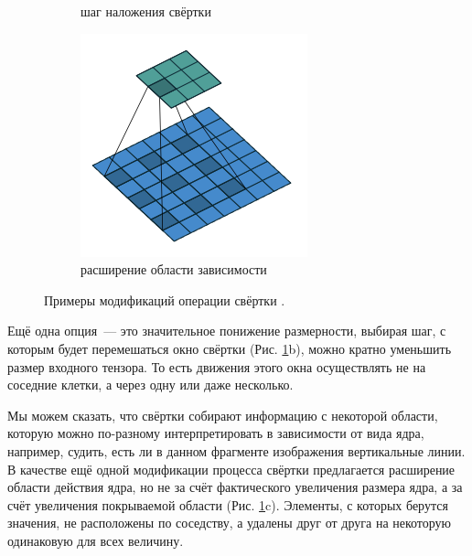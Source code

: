 \documentclass[12pt, fleqn]{article}
\begin{document}
\begin{figure}[ht]
\begin{subfigure}[b]{0.33\textwidth}
            \caption{шаг наложения свёртки}
        \end{subfigure}
        \begin{subfigure}[b]{0.33\textwidth}
            \centering
            \includegraphics[width=\linewidth]{pics/dilation.png}
            \caption{расширение области зависимости}
        \end{subfigure}
        \caption{Примеры модификаций операции свёртки \cite{dumoulin2016guide}.}
        \label{conv_mods}
    \end{figure}

    Ещё одна опция~--- это значительное понижение размерности, выбирая шаг, с которым будет перемешаться
    окно свёртки (Рис. \ref{conv_mods}b), можно кратно уменьшить размер входного
    тензора. То есть движения этого окна осуществлять не на соседние клетки, а через одну или
    даже несколько.
        
    Мы можем сказать, что свёртки собирают информацию с некоторой области, которую можно
    по-разному интерпретировать в зависимости от вида ядра, например, судить,
    есть ли в данном фрагменте изображения вертикальные линии. В качестве
    ещё одной модификации процесса свёртки предлагается расширение области действия ядра, но
    не за счёт фактического увеличения размера ядра, а за счёт увеличения покрываемой области 
    (Рис. \ref{conv_mods}c). Элементы, с которых берутся значения, не расположены по
    соседству, а удалены друг от друга на некоторую одинаковую для всех величину.
        
\end{document}
